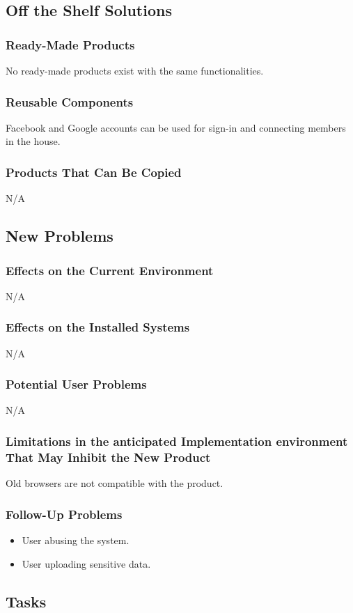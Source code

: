 \documentclass[12pt, titlepage]{article}
\begin{document}
{\subsection{Off the Shelf Solutions}
\subsubsection{Ready-Made Products}
No ready-made products exist with the same functionalities. 
\subsubsection{Reusable Components}
Facebook and Google accounts can be used for sign-in and connecting members in 
the house.
\subsubsection{Products That Can Be Copied}
N/A
\subsection{New Problems}
\subsubsection{Effects on the Current Environment}
N/A
\subsubsection{Effects on the Installed Systems}
N/A
\subsubsection{Potential User Problems}
N/A
\subsubsection{Limitations in the anticipated Implementation environment That 
May Inhibit the New Product}
Old browsers are not compatible with the product.
\subsubsection{Follow-Up Problems}
\begin{itemize}
  \item User abusing the system.
  \item User uploading sensitive data.
\end{itemize}

\subsection{Tasks}
}
\end{document}

